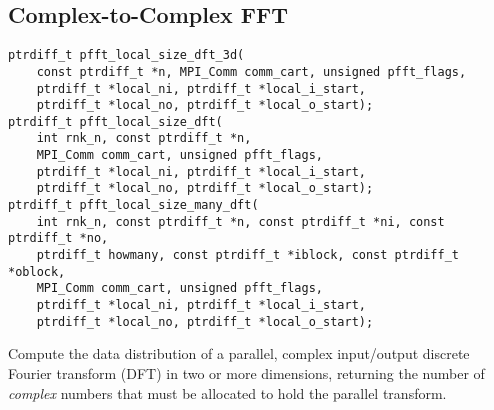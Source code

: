 \subsection{Complex-to-Complex FFT}\label{sec:local-size-c2c}
\begin{lstlisting}
ptrdiff_t pfft_local_size_dft_3d(
    const ptrdiff_t *n, MPI_Comm comm_cart, unsigned pfft_flags,
    ptrdiff_t *local_ni, ptrdiff_t *local_i_start,
    ptrdiff_t *local_no, ptrdiff_t *local_o_start);
ptrdiff_t pfft_local_size_dft(
    int rnk_n, const ptrdiff_t *n,
    MPI_Comm comm_cart, unsigned pfft_flags,
    ptrdiff_t *local_ni, ptrdiff_t *local_i_start,
    ptrdiff_t *local_no, ptrdiff_t *local_o_start);
ptrdiff_t pfft_local_size_many_dft(
    int rnk_n, const ptrdiff_t *n, const ptrdiff_t *ni, const ptrdiff_t *no,
    ptrdiff_t howmany, const ptrdiff_t *iblock, const ptrdiff_t *oblock,
    MPI_Comm comm_cart, unsigned pfft_flags,
    ptrdiff_t *local_ni, ptrdiff_t *local_i_start,
    ptrdiff_t *local_no, ptrdiff_t *local_o_start);
\end{lstlisting}
Compute the data distribution of a parallel, complex input/output discrete Fourier transform (DFT) in two or more dimensions,
returning the number of \emph{complex} numbers that must be allocated to hold the parallel transform.

